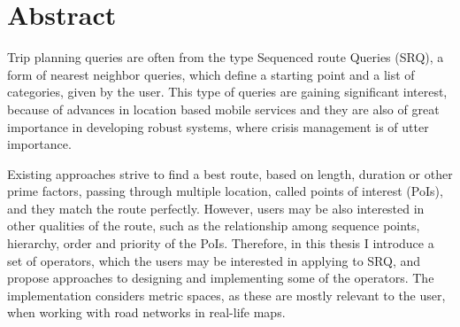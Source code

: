 \chapter{Abstract}

Trip planning queries are often from the type Sequenced route Queries (SRQ), a form of nearest neighbor queries, which define a starting point and a list of categories, given by the user. This type of queries are gaining significant interest, because of advances in location based mobile services and they are also of great importance in developing robust systems, where crisis management is of utter importance. 

\noindent Existing approaches strive to find a best route, based on length, duration or other prime factors, passing through multiple location, called points of interest (PoIs), and they match the route perfectly. However, users may be also interested in other qualities of the route, such as the relationship among sequence points, hierarchy, order and priority of the PoIs. Therefore, in this thesis  I introduce a set of operators, which the users may be interested in applying to SRQ, and propose approaches to designing and implementing some of the operators. The implementation considers metric spaces, as these are mostly relevant to the user, when working with road networks in real-life maps.